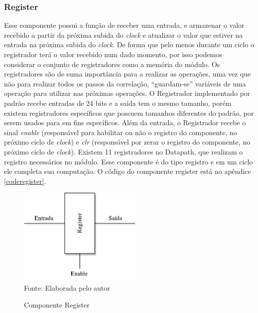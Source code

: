 \subsubsection{Register}
Esse componente possui a função de receber uma entrada, e armazenar o valor recebido a partir da próxima subida do \textit{clock} e atualizar o valor que estiver na entrada na próxima subida do \textit{clock}. De forma que pelo menos durante um ciclo o registrador terá o valor recebido num dado momento, por isso podemos considerar o conjunto de registradores como a memória do módulo. Os registradores são de suma importância para a realizar as operações, uma vez que não para realizar todos os passos da correlação, “guardam-se” variáveis de uma operação para utilizar nas próximas operações. O Registrador implementado por padrão recebe entradas de 24 bits e a saída tem o mesmo tamanho, porém existem registradores específicos que possuem tamanhos diferentes do padrão, por serem usados para em fins específicos. Além da entrada, o Registrador recebe o sinal \textit{enable} (responsável para habilitar ou não o registro do componente, no próximo ciclo de \textit{clock}) e \textit{clr} (responsável por zerar o registro do componente, no próximo ciclo de \textit{clock}). Existem 11 registradores no Datapath, que realizam o registro necessários no módulo. Esse componente é do tipo registro e em um ciclo ele completa sua computação. O código do componente register está no apêndice \ref{coderegister}.

\begin{figure}[H]
	\centering
	\caption{Componente Register}
	\includegraphics[width=6cm]{figures/Register.pdf}\\
	
	{Fonte: Elaborada pelo autor}
	\label{register}
\end{figure}

